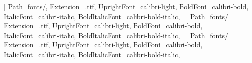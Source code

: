 \setmainfont{calibri-light}[
  Path=fonts/,
  Extension=.ttf,
  UprightFont=calibri-light,
  BoldFont=calibri-bold,
  ItalicFont=calibri-italic,
  BoldItalicFont=calibri-bold-italic,
]
\setsansfont{calibri-light}[
  Path=fonts/,
  Extension=.ttf,
  UprightFont=calibri-light,
  BoldFont=calibri-bold,
  ItalicFont=calibri-italic,
  BoldItalicFont=calibri-bold-italic,
]
\newfontfamily{}[
  Path=fonts/,
  Extension=.ttf,
  UprightFont=calibri-light,
  BoldFont=calibri-bold,
  ItalicFont=calibri-italic,
  BoldItalicFont=calibri-bold-italic,
]
\def\UnirLocalFontsDone{}
